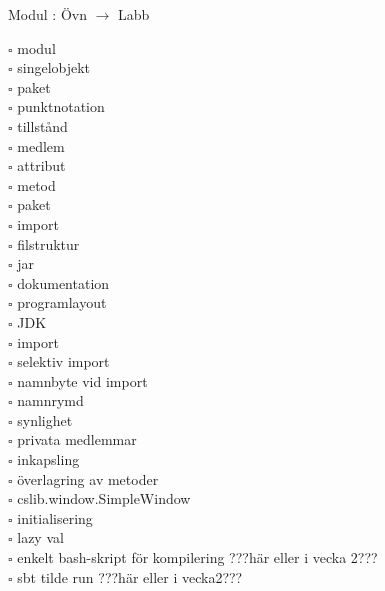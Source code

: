 
    Modul : Övn  $\rightarrow$ Labb 
    \begin{multicols}{3}\SlideFontTiny
    $\square$ modul \\
$\square$ singelobjekt \\
$\square$ paket \\
$\square$ punktnotation \\
$\square$ tillstånd \\
$\square$ medlem \\
$\square$ attribut \\
$\square$ metod \\
$\square$ paket \\
$\square$ import \\
$\square$ filstruktur \\
$\square$ jar \\
$\square$ dokumentation \\
$\square$ programlayout \\
$\square$ JDK \\
$\square$ import \\
$\square$ selektiv import \\
$\square$ namnbyte vid import \\
$\square$ namnrymd \\
$\square$ synlighet \\
$\square$ privata medlemmar \\
$\square$ inkapsling \\
$\square$ överlagring av metoder \\
$\square$ cslib.window.SimpleWindow \\
$\square$ initialisering \\
$\square$ lazy val \\
$\square$ enkelt bash-skript för kompilering ???här eller i vecka 2??? \\
$\square$ sbt tilde run ???här eller i vecka2??? \\
    \end{multicols}
    